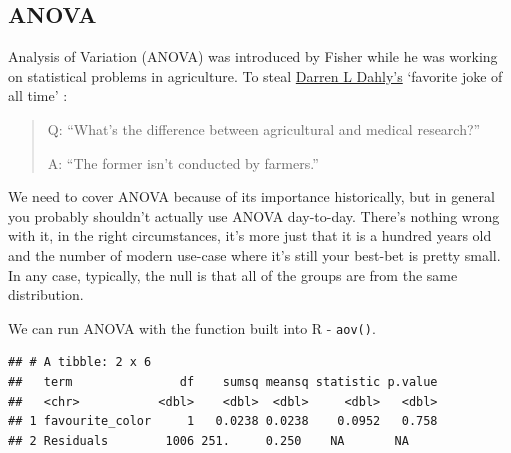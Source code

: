 \documentclass[
]{book}
\newenvironment{Shaded}{\begin{snugshade}}{\end{snugshade}}
\newcommand{\DataTypeTok}[1]{\textcolor[rgb]{0.13,0.29,0.53}{#1}}
\newcommand{\DecValTok}[1]{\textcolor[rgb]{0.00,0.00,0.81}{#1}}
\newcommand{\KeywordTok}[1]{\textcolor[rgb]{0.13,0.29,0.53}{\textbf{#1}}}
\newcommand{\NormalTok}[1]{#1}
\newcommand{\OperatorTok}[1]{\textcolor[rgb]{0.81,0.36,0.00}{\textbf{#1}}}
\newcommand{\StringTok}[1]{\textcolor[rgb]{0.31,0.60,0.02}{#1}}
\begin{document}
\hypertarget{anova}{%
\subsection{ANOVA}\label{anova}}

Analysis of Variation (ANOVA) was introduced by Fisher while he was working on statistical problems in agriculture. To steal \href{https://darrendahly.github.io}{Darren L Dahly's} `favorite joke of all time' \citep{citeDahly}:

\begin{quote}
Q: ``What's the difference between agricultural and medical research?''

A: ``The former isn't conducted by farmers.''
\end{quote}

We need to cover ANOVA because of its importance historically, but in general you probably shouldn't actually use ANOVA day-to-day. There's nothing wrong with it, in the right circumstances, it's more just that it is a hundred years old and the number of modern use-case where it's still your best-bet is pretty small. In any case, typically, the null is that all of the groups are from the same distribution.

We can run ANOVA with the function built into R - \texttt{aov()}.

\begin{Shaded}
\end{Shaded}

\begin{verbatim}
## # A tibble: 2 x 6
##   term               df    sumsq meansq statistic p.value
##   <chr>           <dbl>    <dbl>  <dbl>     <dbl>   <dbl>
## 1 favourite_color     1   0.0238 0.0238    0.0952   0.758
## 2 Residuals        1006 251.     0.250    NA       NA
\end{verbatim}
\end{document}
